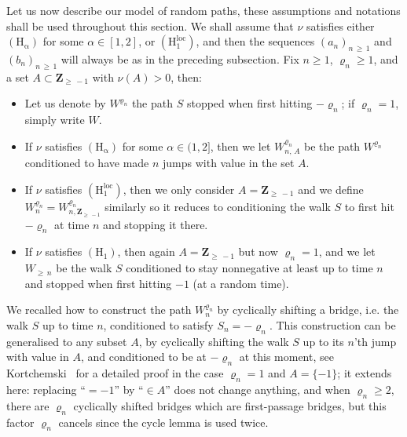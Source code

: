\documentclass[AHL,Unicode,longabstracts,published]{cedram}
\newcommand{\ensembles}[1]{\mathbf{#1}}
\newcommand{\Z}{\ensembles{Z}}
\newcommand{\1}{\ensembles{1}}
\renewcommand{\ge}{\geqslant}
\newcommand{\Hrm}{\mathrm{H}}
\newcommand{\Hrmloc}{\mathrm{(H_1^{loc})}}
\newcommand{\Hrmalp}{\mathrm{(H_\alpha)}}
\begin{document}
Let us now describe our model of random paths, these assumptions and notations shall be used throughout this section. We shall assume that $\nu$ satisfies either $\Hrmalp$ for some $\alpha \in [1,2]$, or $\Hrmloc$, and then the sequences $(a_n)_{n\,\ge\,1}$ and $(b_n)_{n\,\ge\,1}$ will always be as in the preceding subsection. Fix $n \ge 1$, $\varrho_n \ge 1$, and a set $A \subset \Z_{\ge\,-1}$ with $\nu(A) > 0$, then:
\begin{itemize}
\item Let us denote by $W^{\varrho_n}$ the path $S$ stopped when first hitting $-\varrho_n$; if $\varrho_n = 1$, simply write $W$.

\item If $\nu$ satisfies $\Hrmalp$ for some $\alpha \in (1,2]$, then we let $W^{\varrho_n}_{n,\,A}$ be the path $W^{\varrho_n}$ conditioned to have made $n$ jumps with value in the set $A$.

\item If $\nu$ satisfies $\Hrmloc$, then we only consider $A = \Z_{\ge\,-1}$ and we define $W^{\varrho_n}_n=W^{\varrho_n}_{n,\Z_{\ge\,-1}}$ similarly so it reduces to conditioning the walk $S$ to first hit $-\varrho_n$ at time $n$ and stopping it there.

\item If $\nu$ satisfies $(\Hrm_1)$, then again $A = \Z_{\ge\,-1}$ but now $\varrho_n = 1$, and we let $W_{\ge\,n}$ be the walk $S$ conditioned to stay nonnegative at least up to time $n$ and stopped when first hitting $-1$ (at a random time).
\end{itemize}
We recalled how to construct the path $W^{\varrho_n}_{n}$ by cyclically shifting a bridge, i.e. the walk $S$ up to time $n$, conditioned to satisfy $S_n = -\varrho_n$. This construction can be generalised to any subset $A$, by cyclically shifting the walk $S$ up to its $n$'th jump with value in $A$, and conditioned to be at $-\varrho_n$ at this moment, see Kortchemski~\cite[Lemma~6.4]{Kor12} for a detailed proof in the case $\varrho_n = 1$ and $A = \{-1\}$; it extends here: replacing ``$=-1$'' by ``$\in A$'' does not change anything, and when $\varrho_n \ge 2$, there are $\varrho_n$ cyclically shifted bridges which are first-passage bridges, but this factor $\varrho_n$ cancels since the cycle lemma is used twice.
\end{document}

